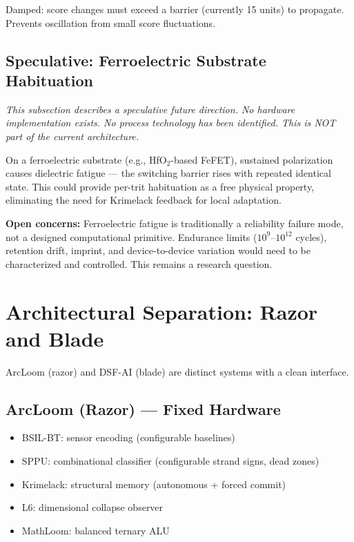 \documentclass[11pt, a4paper]{article}
\begin{document}
Damped: score changes must exceed a barrier (currently 15 units)
to propagate. Prevents oscillation from small score fluctuations.

\subsection{Speculative: Ferroelectric Substrate Habituation}

\textit{This subsection describes a speculative future direction.
No hardware implementation exists. No process technology has
been identified. This is NOT part of the current architecture.}

On a ferroelectric substrate (e.g., HfO$_2$-based FeFET), sustained
polarization causes dielectric fatigue — the switching barrier
rises with repeated identical state. This could provide per-trit
habituation as a free physical property, eliminating the need for
Krimelack feedback for local adaptation.

\textbf{Open concerns:} Ferroelectric fatigue is traditionally a
reliability failure mode, not a designed computational primitive.
Endurance limits ($10^9$--$10^{12}$ cycles), retention drift,
imprint, and device-to-device variation would need to be
characterized and controlled. This remains a research question.

\section{Architectural Separation: Razor and Blade}

ArcLoom (razor) and DSF-AI (blade) are distinct systems with a
clean interface.

\subsection{ArcLoom (Razor) — Fixed Hardware}

\begin{itemize}[nosep]
  \item BSIL-BT: sensor encoding (configurable baselines)
  \item SPPU: combinational classifier (configurable strand signs,
        dead zones)
  \item Krimelack: structural memory (autonomous + forced commit)
  \item L6: dimensional collapse observer
  \item MathLoom: balanced ternary ALU
\end{itemize}
\end{document}
